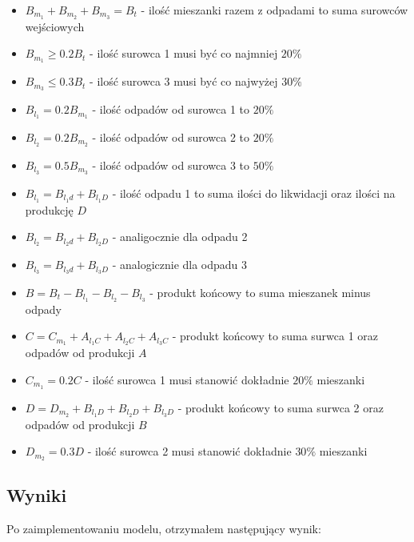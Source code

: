 \documentclass[12pt, a4paper]{article}
\begin{document}
\begin{itemize}
  \item $B_{m_1} + B_{m_2} + B_{m_3} = B_t$ - ilość mieszanki razem z odpadami to suma surowców wejściowych
  \item $B_{m_1} \geq 0.2B_t$ - ilość surowca 1 musi być co najmniej $20\%$
  \item $B_{m_3} \leq 0.3B_t$ - ilość surowca 3 musi być co najwyżej $30\%$
  \item $B_{l_1} = 0.2B_{m_1}$ - ilość odpadów od surowca 1 to $20\%$
  \item $B_{l_2} = 0.2B_{m_2}$ - ilość odpadów od surowca 2 to $20\%$
  \item $B_{l_3} = 0.5B_{m_3}$ - ilość odpadów od surowca 3 to $50\%$
  \item $B_{l_1} = B_{l_1d} + B_{l_1D}$ - ilość odpadu 1 to suma ilości do likwidacji oraz ilości na produkcję $D$ 
  \item $B_{l_2} = B_{l_2d} + B_{l_2D}$ - analigocznie dla odpadu 2
  \item $B_{l_3} = B_{l_3d} + B_{l_3D}$ - analogicznie dla odpadu 3
  \item $B = B_t - B_{l_1} - B_{l_2} - B_{l_3}$ - produkt końcowy to suma mieszanek minus odpady

  \item $C = C_{m_1} + A_{l_1C} + A_{l_2C} + A_{l_3C}$ - produkt końcowy to suma surwca 1 oraz odpadów od produkcji $A$
  \item $C_{m_1} = 0.2C$ - ilość surowca 1 musi stanowić dokładnie $20\%$ mieszanki

  \item $D = D_{m_2} + B_{l_1D} + B_{l_2D} + B_{l_3D}$ - produkt końcowy to suma surwca 2 oraz odpadów od produkcji $B$
  \item $D_{m_2} = 0.3D$ - ilość surowca 2 musi stanowić dokładnie $30\%$ mieszanki
\end{itemize}

\subsection{Wyniki}

Po zaimplementowaniu modelu, otrzymałem następujący wynik:
\end{document}
